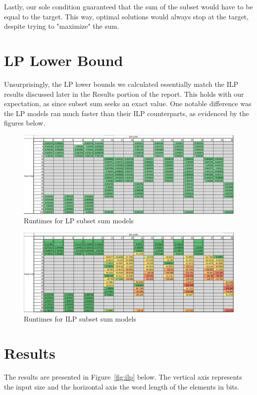\documentclass{article}
\begin{document}
Lastly, our sole condition guaranteed that the sum of the subset would have to be equal to the target. 
This way, optimal solutions would always stop at the target, despite trying to "maximize" the sum.

\section{LP Lower Bound}
Unsurprisingly, the LP lower bounds we calculated essentially match the ILP results discussed later 
in the Results portion of the report. This holds with our expectation, as since subset sum seeks an 
exact value. One notable difference was the LP models ran much faster than their ILP counterparts, as 
evidenced by the figures below.

\begin{figure}[h]
\centering
\includegraphics[width=12cm]{p4_LP_rt.png}
\caption{Runtimes for LP subset sum models}
\label{fig:lp_rt}
\end{figure}

\begin{figure}[h]
\centering
\includegraphics[width=12cm]{p4_ILP_rt.png}
\caption{Runtimes for ILP subset sum models}
\label{fig:ilp_rt}
\end{figure}

\section{Results}

The results are presented in Figure~\ref{fig:ilp} below. The vertical axis represents the
input size and the horizontal axis the word length of the elements in bits.
\end{document}
